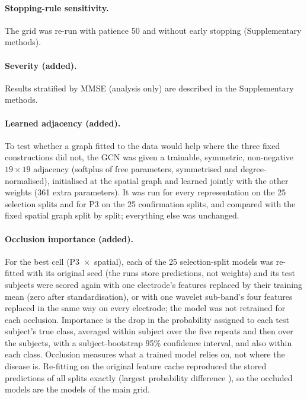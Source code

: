\paragraph{Stopping-rule sensitivity.} The grid was re-run with patience 50 and without early stopping (Supplementary methods).

\paragraph{Severity (added).} Results stratified by MMSE (analysis only) are described in the Supplementary methods.

\paragraph{Learned adjacency (added).} To test whether a graph fitted to the data would help where
the three fixed constructions did not, the GCN was given a trainable, symmetric, non-negative
$19\times19$ adjacency (softplus of free parameters, symmetrised and degree-normalised), initialised at
the spatial graph and learned jointly with the other weights (361 extra parameters). It was run for
every representation on the 25 selection splits and for P3 on the 25 confirmation splits, and compared
with the fixed spatial graph split by split; everything else was unchanged.

\paragraph{Occlusion importance (added).} For the best cell (P3~$\times$~spatial), each of the 25
selection-split models was re-fitted with its original seed (the runs store predictions, not weights)
and its test subjects were scored again with one electrode's features replaced by their training mean
(zero after standardisation), or with one wavelet sub-band's four features replaced in the same way on
every electrode; the model was not retrained for each occlusion. Importance is the drop in the
probability assigned to each test subject's true class, averaged within subject over the five repeats
and then over the \occNSubjects{} subjects, with a subject-bootstrap 95\% confidence interval, and also
within each class. Occlusion measures what a trained model relies on, not
where the disease is. Re-fitting on the original feature cache reproduced the stored predictions of all
 splits exactly (largest probability difference ), so the occluded models are the
models of the main grid.

